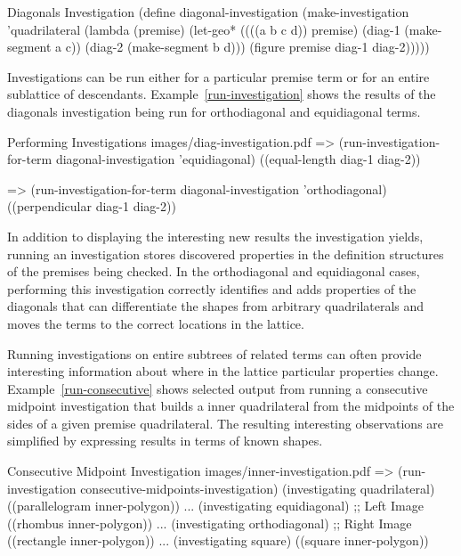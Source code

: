 \begin{code-example}
[label=diag-investigation]
{Diagonals Investigation}
(define diagonal-investigation
  (make-investigation
   'quadrilateral
   (lambda (premise)
     (let-geo*
         ((((a b c d)) premise)
          (diag-1 (make-segment a c))
          (diag-2 (make-segment b d)))
       (figure premise diag-1 diag-2)))))
\end{code-example}

Investigations can be run either for a particular premise term or for
an entire sublattice of descendants. Example~\ref{run-investigation}
shows the results of the diagonals investigation being run for
orthodiagonal and equidiagonal terms.

\begin{pdf-example}
[label=run-investigation]
{Performing Investigations}
{images/diag-investigation.pdf}
=> (run-investigation-for-term diagonal-investigation 'equidiagonal)
((equal-length diag-1 diag-2))

=> (run-investigation-for-term diagonal-investigation 'orthodiagonal)
((perpendicular diag-1 diag-2))
\end{pdf-example}

In addition to displaying the interesting new results the
investigation yields, running an investigation stores discovered
properties in the definition structures of the premises being
checked. In the orthodiagonal and equidiagonal cases, performing this
investigation correctly identifies and adds properties of the
diagonals that can differentiate the shapes from arbitrary
quadrilaterals and moves the terms to the correct locations in the
lattice.

Running investigations on entire subtrees of related terms can often
provide interesting information about where in the lattice particular
properties change. Example~\ref{run-consecutive} shows selected output
from running a consecutive midpoint investigation that builds a inner
quadrilateral from the midpoints of the sides of a given premise
quadrilateral. The resulting interesting observations are simplified
by expressing results in terms of known shapes.

\begin{pdf-example}
[label=run-consecutive,
comment style={frame hidden,
opacityback=0,
height=5.6cm,
raster columns=2,graphics pages={1,2}}]
{Consecutive Midpoint Investigation \protect{}}
{images/inner-investigation.pdf}
=> (run-investigation consecutive-midpoints-investigation)
(investigating quadrilateral)
   ((parallelogram inner-polygon))
...
(investigating equidiagonal)   ;; Left Image
   ((rhombus inner-polygon))
...
(investigating orthodiagonal)  ;; Right Image
   ((rectangle inner-polygon))
...
(investigating square)
   ((square inner-polygon))
\end{pdf-example}

